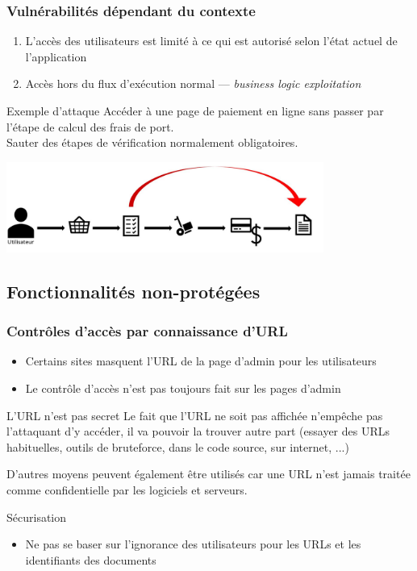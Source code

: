 \documentclass{beamer}
\begin{document}
\begin{frame}
  \frametitle{Vulnérabilités dépendant du contexte}
  \begin{enumerate}
    \item[Vulnérabilité] L'accès des utilisateurs est limité à ce qui est autorisé selon l'état actuel de l'application
    \item[Type d'attaque] Accès hors du flux d'exécution normal --- \emph{business logic exploitation}
  \end{enumerate}
  \begin{block}{Exemple d'attaque}
    Accéder à une page de paiement en ligne sans passer par l'étape de calcul des frais de port.\\
    Sauter des étapes de vérification normalement obligatoires.
  \end{block}
  \begin{center}
    \includegraphics[height=8em]{escalade-hors-flux}
  \end{center}
\end{frame}



\subsection{Fonctionnalités non-protégées}

\begin{frame}
  \frametitle{Contrôles d'accès par connaissance d'URL}
  \begin{itemize}
    \item Certains sites masquent l'URL de la page d'admin pour les utilisateurs
    \item Le contrôle d'accès n'est pas toujours fait sur les pages d'admin
  \end{itemize}
  \begin{block}{L'URL n'est pas secret}
    Le fait que l'URL ne soit pas affichée n'empêche pas l'attaquant d'y accéder, il va pouvoir la trouver autre part (essayer des URLs habituelles, outils de bruteforce, dans le code source, sur internet, ...)
    
    D'autres moyens peuvent également être utilisés car une URL n'est jamais traitée comme confidentielle par les logiciels et serveurs.
  \end{block}
  \begin{exampleblock}{Sécurisation}
    \begin{itemize}
      \item Ne pas se baser sur l'ignorance des utilisateurs pour les URLs et les identifiants des documents
    \end{itemize}
  \end{exampleblock}
\end{frame}
\end{document}
